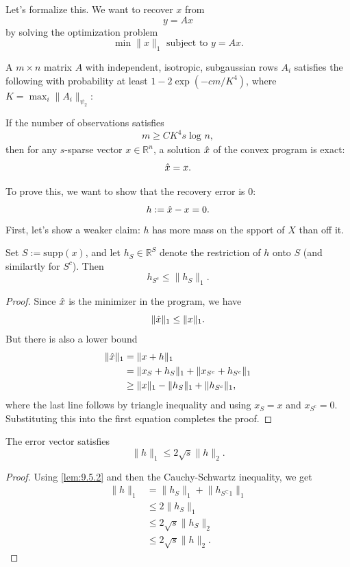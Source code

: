 Let's formalize this. We want to recover $x$ from 
\[ y = Ax \]
by solving the optimization problem 
\[ \min_{}\lVert x \rVert_{1} \text{ subject to } y = Ax. \]

\begin{theorem}
\label{thm:9.5.1} A $m \times n$ matrix $A$ with independent, isotropic, subgaussian rows $A_i$ satisfies the 
following with probability at least $1 - 2 \exp{(-cm/K^4)}$, where $K = \max_{i}\lVert A_i \rVert_{\psi_2}$:

If the number of observations satisfies 
\[ m \geq CK^4 s \log_{}{n}, \]
then for any $s$-sparse vector $x \in \mathbb{R}^n$, a solution $\Hat{x}$ of the convex program is exact:
\[ \Hat{x} = x. \]
\end{theorem}

To prove this, we want to show that the recovery error is 0:
\[ h := \Hat{x} - x = 0. \]
First, let's show a weaker claim: $h$ has more mass on the spport of $X$ than off it.

\begin{lemma}
\label{lem:9.5.2}
Set $S := \mathrm{supp}(x)$, and let $h_S \in \mathbb{R}^S$ denote the restriction of $h$ onto $S$ (and 
similartly for $S^c$). Then 
\[ h_{S^c} \leq \lVert h_S \rVert_{1}. \]
\end{lemma}

\begin{proof}
Since $\Hat{x}$ is the minimizer in the program, we have 
\[ \lVert \Hat{x} \rVert_{1} \leq \lVert x \rVert_{1}. \]
But there is also a lower bound
\begin{align*}
	\lVert \Hat{x} \rVert_{1} 
	&= \lVert x + h \rVert_{1} \\
	&= \lVert x_S + h_S \rVert_{1} + \lVert x_{S^c} + h_{S^c} \rVert_{1} \\
	&\geq \lVert x \rVert_{1} - \lVert h_S \rVert_{1} + \lVert h_{S^c} \rVert_{1},
\end{align*}
where the last line follows by triangle inequality and using $x_S = x$ and $x_{S^c} = 0$. Substituting this 
into the first equation completes the proof.
\end{proof}

\begin{lemma}
\label{lem:9.5.3}
The error vector satisfies 
\[ \lVert h \rVert_{1} \leq 2 \sqrt{s}\lVert h \rVert_{2}. \]
\end{lemma}

\begin{proof}
Using \cref{lem:9.5.2} and then the Cauchy-Schwartz inequality, we get 
\begin{align*}
	\lVert h \rVert_{1} 
	&= \lVert h_S \rVert_{1} + \lVert h_{S^\subset1} \rVert_{1} \\
	&\leq 2 \lVert h_S \rVert_{1} \\
	&\leq 2 \sqrt{s}\lVert h_S \rVert_{2} \\
	&\leq 2 \sqrt{s}\lVert h \rVert_{2}.
\end{align*}
\end{proof}

